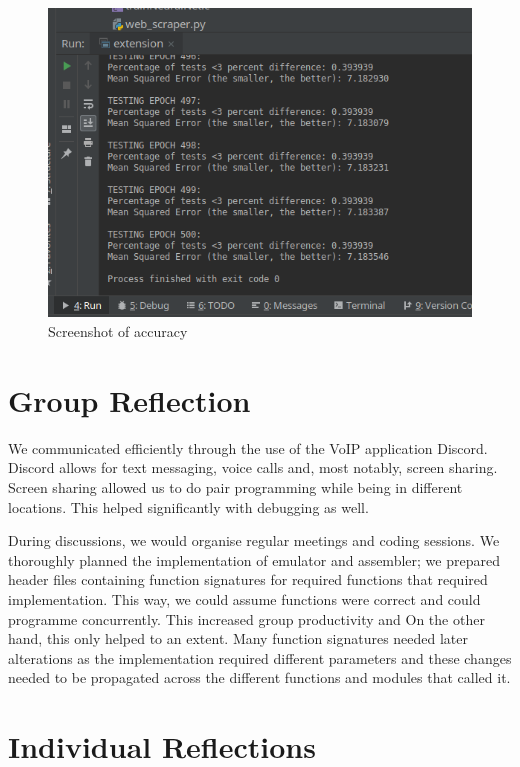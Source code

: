 \documentclass[11pt]{article}
\begin{document}
\begin{figure}
\centering
\includegraphics[scale=0.5]{accuracy}
\caption{Screenshot of accuracy}
\end{figure}

\section{Group Reflection}
We communicated efficiently through the use of the VoIP application Discord. 
Discord allows for text messaging, voice calls and, most notably, screen sharing.
Screen sharing allowed us to do pair programming while being in different locations. This helped significantly with debugging as well. 

During discussions, we would organise regular meetings and coding sessions. We thoroughly planned the implementation of emulator and assembler; we prepared header files containing function signatures
for required functions that 
 required implementation. This way, we could assume functions were correct and could programme concurrently.
This increased group productivity and 
On the other hand, this only helped to an extent. Many function signatures needed later alterations 
as the implementation required different parameters and these changes needed to be propagated 
across the different functions and modules that called it.

\section{Individual Reflections}
\end{document}
